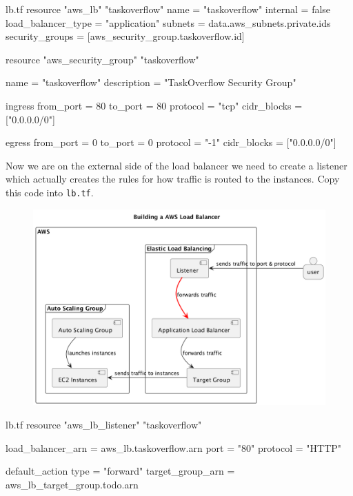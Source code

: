 \documentclass{csse4400}
\begin{document}
\begin{code}[language=terraform,numbers=none,keepspaces=true]{lb.tf}
resource "aws_lb" "taskoverflow" {
  name               = "taskoverflow"
  internal           = false
  load_balancer_type = "application"
  subnets            = data.aws_subnets.private.ids
  security_groups    = [aws_security_group.taskoverflow.id]
}

resource "aws_security_group" "taskoverflow" {
  name          = "taskoverflow"
  description   = "TaskOverflow Security Group"

  ingress {
    from_port   = 80
    to_port     = 80
    protocol    = "tcp"
    cidr_blocks = ["0.0.0.0/0"]
  }

  egress {
    from_port   = 0
    to_port     = 0
    protocol    = "-1"
    cidr_blocks = ["0.0.0.0/0"]
  }
}
\end{code}

Now we are on the external side of the load balancer we need to create a listener which actually creates the rules for how traffic is routed to the instances. Copy this code into \texttt{lb.tf}.

\begin{figure}[H]
  \begin{center}
    \includegraphics[scale=0.2]{diagrams/lb4}
  \end{center}
\end{figure}

\begin{code}[language=terraform,numbers=none,keepspaces=true]{lb.tf}
resource "aws_lb_listener" "taskoverflow" {
  load_balancer_arn = aws_lb.taskoverflow.arn
  port              = "80"
  protocol          = "HTTP"

  default_action {
    type             = "forward"
    target_group_arn = aws_lb_target_group.todo.arn
  }
}
\end{code}
\end{document}
